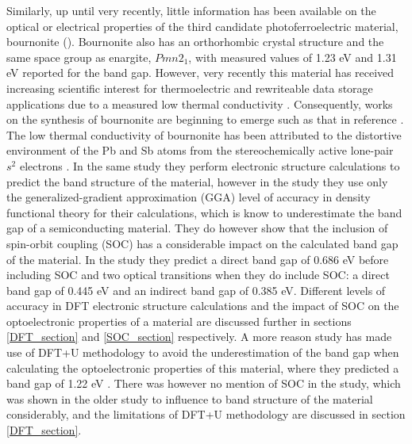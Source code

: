 Similarly, up until very recently, little information has been available on the optical or electrical properties of the third candidate photoferroelectric material, bournonite (\bournonite). Bournonite also has an orthorhombic crystal structure and the same space group as enargite,  $Pmn2_1$, with measured values of 1.23 eV \cite{Dittrich1} and 1.31 eV \cite{bournonite} reported for the band gap. However, very recently this material has received increasing scientific interest for thermoelectric and rewriteable data storage applications due to a measured low thermal conductivity \cite{Dong}. 
Consequently, works on the synthesis of bournonite are beginning to emerge such as that in reference .
The low thermal conductivity of bournonite has been attributed to the distortive environment of the Pb and Sb atoms from the stereochemically active lone-pair $s^2$ electrons \cite{Dong}. In the same study they perform electronic structure calculations to predict the band structure of the material, however in the study they use only the generalized-gradient approximation (GGA) level of accuracy in density functional theory for their calculations, which is know to underestimate the band gap of a semiconducting material. They do however show that the inclusion of spin-orbit coupling (SOC) has a considerable impact on the calculated band gap of the material. In the study they predict a direct band gap of 0.686 eV before including SOC and two optical transitions when they do include SOC: a direct band gap of 0.445 eV and an indirect band gap of 0.385 eV. Different levels of accuracy in DFT electronic structure calculations and the impact of SOC on the optoelectronic properties of a material are discussed further in sections \ref{DFT_section} and \ref{SOC_section} respectively. 
A more reason study has made use of DFT+U methodology to avoid the underestimation of the band gap when calculating the optoelectronic properties of this material, where they predicted a band gap of 1.22 eV \cite{bournonite_new}. There was however no mention of SOC in the study, which was shown in the older study to influence to band structure of the material considerably, and the limitations of DFT+U methodology are discussed in section \ref{DFT_section}.\\


